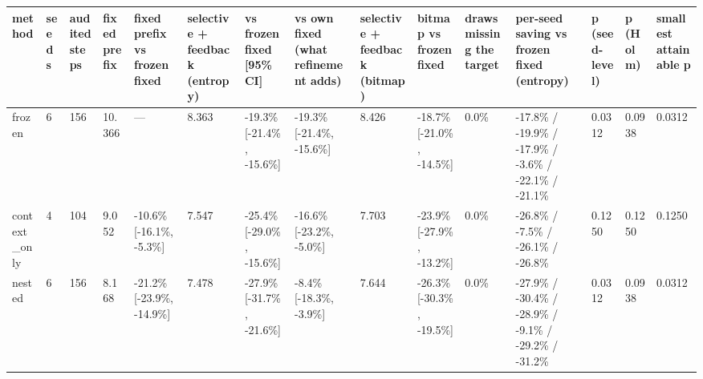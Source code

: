 \begin{tabular}{lllllllllllllll}
\hline
method & seeds & audited steps & fixed prefix & fixed prefix vs frozen fixed & selective + feedback (entropy) & vs frozen fixed [95\% CI] & vs own fixed (what refinement adds) & selective + feedback (bitmap) & bitmap vs frozen fixed & draws missing the target & per-seed saving vs frozen fixed (entropy) & p (seed-level) & p (Holm) & smallest attainable p \\
\hline
frozen & 6 & 156 & 10.366 & — & 8.363 & -19.3\% [-21.4\%, -15.6\%] & -19.3\% [-21.4\%, -15.6\%] & 8.426 & -18.7\% [-21.0\%, -14.5\%] & 0.0\% & -17.8\% / -19.9\% / -17.9\% / -3.6\% / -22.1\% / -21.1\% & 0.0312 & 0.0938 & 0.0312 \\
context\_only & 4 & 104 & 9.052 & -10.6\% [-16.1\%, -5.3\%] & 7.547 & -25.4\% [-29.0\%, -15.6\%] & -16.6\% [-23.2\%, -5.0\%] & 7.703 & -23.9\% [-27.9\%, -13.2\%] & 0.0\% & -26.8\% / -7.5\% / -26.1\% / -26.8\% & 0.1250 & 0.1250 & 0.1250 \\
nested & 6 & 156 & 8.168 & -21.2\% [-23.9\%, -14.9\%] & 7.478 & -27.9\% [-31.7\%, -21.6\%] & -8.4\% [-18.3\%, -3.9\%] & 7.644 & -26.3\% [-30.3\%, -19.5\%] & 0.0\% & -27.9\% / -30.4\% / -28.9\% / -9.1\% / -29.2\% / -31.2\% & 0.0312 & 0.0938 & 0.0312 \\
\hline
\end{tabular}
